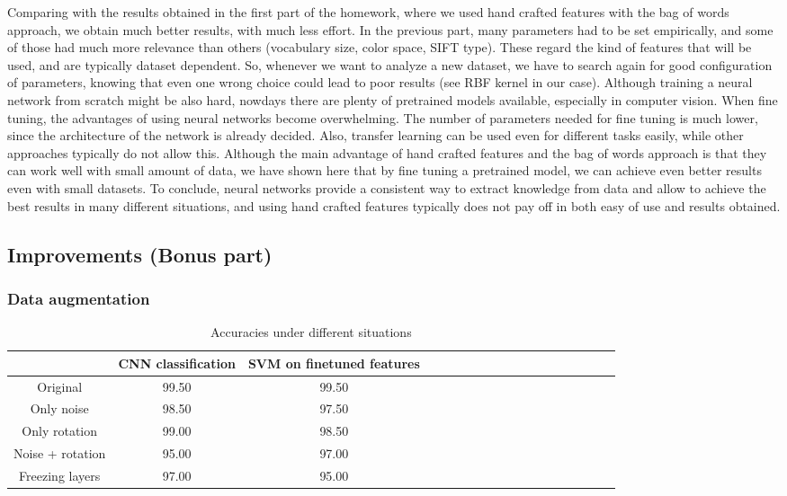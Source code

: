 \documentclass{article}
\begin{document}
Comparing with the results obtained in the first part of the homework, where we used hand crafted features with the bag of words approach, we obtain much better results, with much less effort. In the previous part, many parameters had to be set empirically, and some of those had much more relevance than others (vocabulary size, color space, SIFT type). These regard the kind of features that will be used, and are typically dataset dependent. So, whenever we want to analyze a new dataset, we have to search again for good configuration of parameters, knowing that even one wrong choice could lead to poor results (see RBF kernel in our case). Although training a neural network from scratch might be also hard, nowdays there are plenty of pretrained models available, especially in computer vision. When fine tuning, the advantages of using neural networks become overwhelming. The number of parameters needed for fine tuning is much lower, since the architecture of the network is already decided. Also, transfer learning can be used even for different tasks easily, while other approaches typically do not allow this. Although the main advantage of hand crafted features and the bag of words approach is that they can work well with small amount of data, we have shown here that by fine tuning a pretrained model, we can achieve even better results even with small datasets.
To conclude, neural networks provide a consistent way to extract knowledge from data and allow to achieve the best results in many different situations, and using hand crafted features typically does not pay off in both easy of use and results obtained.

\subsection{Improvements (Bonus part)}
\subsubsection{Data augmentation}

\begin{table}
	\centering
	\captionsetup{justification=centering}
	\renewcommand{\arraystretch}{1.5}
	\setlength{\abovecaptionskip}{15pt plus 3pt minus 2pt} %
	\begin{tabular}{|c|c|c|c|c|c|c|c|c|c|c|c|c|c|c|c|c|c|}
		\hline
		& \textbf{CNN classification} & \textbf{SVM on finetuned features}  \\
		\hline
	Original          & 99.50 & 99.50  \\ \hline
	Only noise          & 98.50 & 97.50  \\ \hline
	Only rotation          & 99.00 & 98.50  \\ \hline
	Noise + rotation          & 95.00 & 97.00  \\ \hline
	Freezing layers          & 97.00 & 95.00  \\ \hline

	\end{tabular}
    \caption{Accuracies under different situations}
	\label{tab:res_augment}
\end{table}
\end{document}
